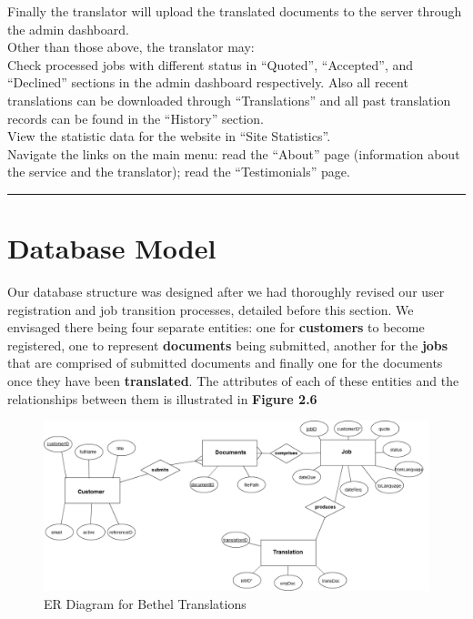\documentclass{l3proj}
\begin{document}
Finally the translator will upload the translated documents to the server through the admin dashboard.\\

Other than those above, the translator may: \\

Check processed jobs with different status in “Quoted”, “Accepted”, and “Declined” sections in the admin dashboard respectively. Also all recent translations can be downloaded through “Translations” and all past translation records can be found in the “History” section.\\

View the statistic data for the website in “Site Statistics”.\\

	Navigate the links on the main menu: read the “About” page (information about the service and the translator); read the “Testimonials” page.\\


\newpage
\rule{430pt}{1pt}

\section{Database Model}

Our database structure was designed after we had thoroughly revised our user registration and job transition 
processes, detailed before this section. We envisaged there being four separate entities: one for \textbf{customers} to become 
registered, one to represent \textbf{documents} being submitted, another for the \textbf{jobs} that are comprised 
of submitted documents and finally one for the documents once they have been \textbf{translated}. 
The attributes of each of these entities and the relationships between them is illustrated in \textbf{Figure 2.6} 

\begin{figure}
\begin{center}
\includegraphics[scale=0.5,angle=90]{bt-erdiag}
\caption{ER Diagram for Bethel Translations}
\end{center}
\end{figure}
\end{document}
